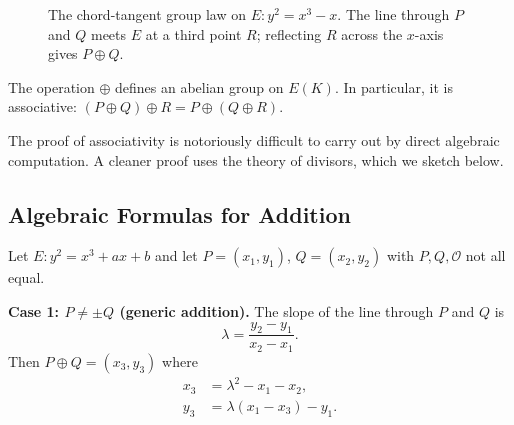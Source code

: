 \begin{figure}[htbp]
\centering
{}
\caption{The chord-tangent group law on $E: y^2 = x^3 - x$. The line through $P$ and $Q$ meets $E$ at a third point $R$; reflecting $R$ across the $x$-axis gives $P \oplus Q$.}
\label{fig:chord-tangent}
\end{figure}

\begin{proposition}[Associativity]
The operation $\oplus$ defines an abelian group on $E(K)$. In particular, it is associative: $(P \oplus Q) \oplus R = P \oplus (Q \oplus R)$.
\end{proposition}

The proof of associativity is notoriously difficult to carry out by direct algebraic computation. A cleaner proof uses the theory of divisors, which we sketch below.

\subsection{Algebraic Formulas for Addition}

Let $E: y^2 = x^3 + ax + b$ and let $P = (x_1, y_1)$, $Q = (x_2, y_2)$ with $P, Q, \mathcal{O}$ not all equal.

\textbf{Case 1: $P \neq \pm Q$ (generic addition).}
The slope of the line through $P$ and $Q$ is
\[
\lambda = \frac{y_2 - y_1}{x_2 - x_1}.
\]
Then $P \oplus Q = (x_3, y_3)$ where
\begin{align}
x_3 &= \lambda^2 - x_1 - x_2, \label{eq:x3-add} \\
y_3 &= \lambda(x_1 - x_3) - y_1. \label{eq:y3-add}
\end{align}

